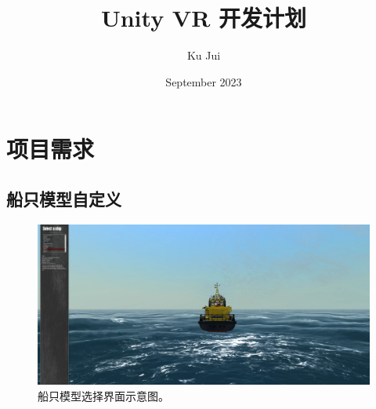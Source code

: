 \documentclass[letterpaper,10pt]{article}
\begin{document}
	
	
	\title{\songti {}Unity VR 开发计划}
	\author{\textrm{Ku Jui}}
	\date{\textrm{September 2023}}
	\maketitle
	
	\renewcommand{\figurename}{Figure} %
	\renewcommand{\contentsname}{Contents}
	\renewcommand{\tablename}{Table}
	\tableofcontents  %

	\section{项目需求}
	
		\subsection{船只模型自定义}
				
		\begin{figure}[htbp]
			\centering				\includegraphics[width=\columnwidth]{picture/Select a ship}
			\caption{
				\label{fig: Select a ship} 
				船只模型选择界面示意图。
			}	
		\end{figure}
	
\end{document}
